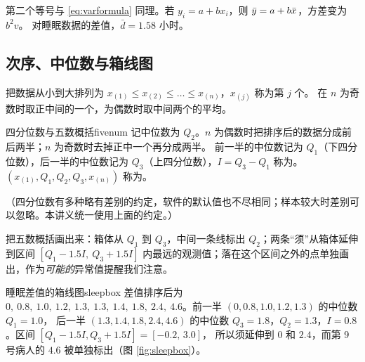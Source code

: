 第二个等号与 \eqref{eq:varformula} 同理。若 $y_i=a+bx_i$，则 $\bar{y}=a+b\bar{x}$，方差变为 $b^2v$。
对睡眠数据的差值，$\bar d=1.58$ 小时。

\subsection{次序、中位数与箱线图}

把数据从小到大排列为 $x_{(1)}\le x_{(2)}\le\dots\le x_{(n)}$，$x_{(j)}$ 称为第 $j$ 个。
在 $n$ 为奇数时取正中间的一个，为偶数时取中间两个的平均。

\begin{definition}{四分位数与五数概括}{fivenum}
记中位数为 $Q_2$。$n$ 为偶数时把排序后的数据分成前后两半；$n$ 为奇数时去掉正中一个再分成两半。
前一半的中位数记为 $Q_1$（下四分位数），后一半的中位数记为 $Q_3$（上四分位数），$I=Q_3-Q_1$ 称为。
$(x_{(1)},Q_1,Q_2,Q_3,x_{(n)})$ 称为。
\end{definition}

（四分位数有多种略有差别的约定，软件的默认值也不尽相同；样本较大时差别可以忽略。本讲义统一使用上面的约定。）

把五数概括画出来：箱体从 $Q_1$ 到 $Q_3$，中间一条线标出 $Q_2$；两条“须”从箱体延伸到区间
$[Q_1-1.5I,\ Q_3+1.5I]$ 内最远的观测值；落在这个区间之外的点单独画出，作为\emph{可能的}异常值提醒我们注意。

\begin{example}{睡眠差值的箱线图}{sleepbox}
差值排序后为 $0,\ 0.8,\ 1.0,\ 1.2,\ 1.3,\ 1.3,\ 1.4,\ 1.8,\ 2.4,\ 4.6$。前一半 $(0,0.8,1.0,1.2,1.3)$ 的中位数 $Q_1=1.0$，
后一半 $(1.3,1.4,1.8,2.4,4.6)$ 的中位数 $Q_3=1.8$，$Q_2=1.3$，$I=0.8$。区间 $[Q_1-1.5I,Q_3+1.5I]=[-0.2,\,3.0]$，
所以须延伸到 $0$ 和 $2.4$，而第 9 号病人的 $4.6$ 被单独标出（图 \ref{fig:sleepbox}）。
\end{example}

